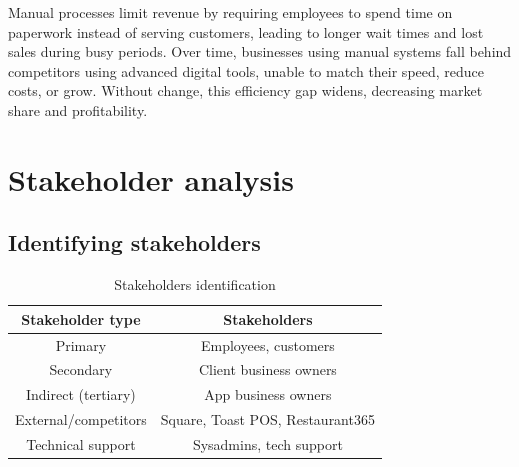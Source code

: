 \documentclass[]{VUMIFTemplateClass}
\begin{document}
Manual processes limit revenue by requiring employees to spend time on paperwork instead of serving customers, leading to longer wait times and lost sales during busy periods. Over time, businesses using manual systems fall behind competitors using advanced digital tools, unable to match their speed, reduce costs, or grow. Without change, this efficiency gap widens, decreasing market share and profitability.


\section{Stakeholder analysis}

\subsection{Identifying stakeholders}

\begin{table}[h]
  \centering
  \caption{Stakeholders identification}
  \begin{tabular}{|c|c|}
    \hline
    Stakeholder type    & Stakeholders \\ \hline
    Primary             & Employees, customers \\ \hline
    Secondary           & Client business owners \\ \hline
    Indirect (tertiary) & App business owners \\ \hline
    External/competitors & Square, Toast POS, Restaurant365 \\ \hline
    Technical support   & Sysadmins, tech support \\ \hline
  \end{tabular}
  \label{tab:stakeholders}
\end{table}
\end{document}
